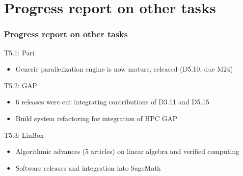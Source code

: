 \documentclass{beamer}
\begin{document}
\section{Progress report on other tasks}
\begin{frame}
  \frametitle{Progress report on other tasks}

  \begin{block}{T5.1: Pari}
    \begin{itemize}
    \item Generic parallelization engine is now mature, released (D5.10, due M24)
    \end{itemize}
  \end{block}
  \begin{block}{T5.2: GAP}
    \begin{itemize}
    \item 6 releases were cut integrating contributions of D3.11 and D5.15
    \item Build system refactoring for integration of HPC GAP
    \end{itemize}
  \end{block}
  \begin{block}{T5.3: LinBox}
    \begin{itemize}
    \item Algorithmic advances (5  articles) on linear algebra and
      verified computing
    \item Software releases and integration into SageMath
    \end{itemize}
  \end{block}
\end{frame}
\end{document}

